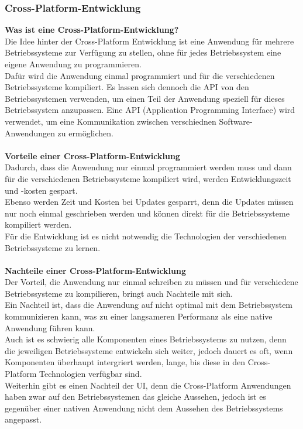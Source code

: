 \documentclass[ngerman]{article}
\begin{document}
    \subsubsection{Cross-Platform-Entwicklung}
    \textbf{Was ist eine Cross-Platform-Entwicklung?}\\
    Die Idee hinter der Cross-Platform Entwicklung ist eine Anwendung für mehrere Betriebssysteme zur Verfügung zu stellen, ohne für jedes Betriebssystem eine eigene Anwendung zu programmieren.\\
    Dafür wird die Anwendung einmal programmiert und für die verschiedenen Betriebssysteme kompiliert. Es lassen sich dennoch die API von den Betriebssystemen verwenden, um einen Teil der Anwendung speziell für dieses Betriebssystem anzupassen. \cite{CrossPlatform} Eine API (Application Programming Interface) wird verwendet, um eine Kommunikation zwischen verschiednen Software-Anwendungen zu ermöglichen.\\\\
    \textbf{Vorteile einer Cross-Platform-Entwicklung}\\
    Dadurch, dass die Anwendung nur einmal programmiert werden muss und dann für die verschiedenen Betriebssysteme kompiliert wird, werden Entwicklungszeit und -kosten gespart.\\
    Ebenso werden Zeit und Kosten bei Updates gesparrt, denn die Updates müssen nur noch einmal geschrieben werden und können direkt für die Betriebssysteme kompiliert werden. \cite{CrossPlatformA}\\
    Für die Entwicklung ist es nicht notwendig die Technologien der verschiedenen Betriebssysteme zu lernen. \cite{CrossPlatformAD}\\\\
    \textbf{Nachteile einer Cross-Platform-Entwicklung}\\
    Der Vorteil, die Anwendung nur einmal schreiben zu müssen und für verschiedene Betriebssysteme zu kompilieren, bringt auch Nachteile mit sich.\\
    Ein Nachteil ist, dass die Anwendung auf nicht optimal mit dem Betriebssystem kommunizieren kann, was zu einer langsameren Performanz als eine native Anwendung führen kann.\\
    Auch ist es schwierig alle Komponenten eines Betriebssystems zu nutzen, denn die jeweiligen Betriebssysteme entwickeln sich weiter, jedoch dauert es oft, wenn Komponenten überhaupt intergriert werden, lange, bis diese in den Cross-Platform Technologien verfügbar sind.\\
    Weiterhin gibt es einen Nachteil der UI, denn die Cross-Platform Anwendungen haben zwar auf den Betriebssystemen das gleiche Aussehen, jedoch ist es gegenüber einer nativen Anwendung nicht dem Aussehen des Betriebssystems angepasst. \cite{CrossPlatformD}
\end{document}
